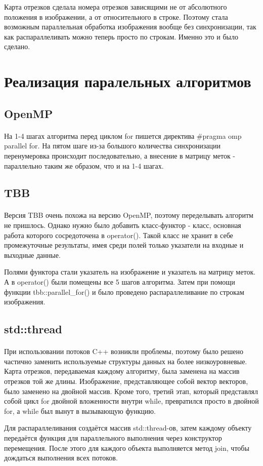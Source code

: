 \documentclass[14pt]{extarticle}
\begin{document}
\par Карта отрезков сделала номера отрезков зависящими не от абсолютного положения в изображении, а от относительного в строке. Поэтому стала возможным параллельная обработка изображения вообще без синхронизации, так как распараллеливать можно теперь просто по строкам. Именно это и было сделано.
\newpage
\section{Реализация паралельных алгоритмов}
\subsection{OpenMP}
\paragraph{} На 1-4 шагах алгоритма перед циклом for пишется директива \#pragma omp parallel for. На пятом шаге из-за большого количества синхронизации перенумеровка происходит последовательно, а внесение в матрицу меток - параллельно таким же образом, что и на 1-4 шагах.
\subsection{TBB}
\paragraph{} Версия TBB очень похожа на версию OpenMP, поэтому переделывать алгоритм не пришлось. Однако нужно было добавить класс-функтор - класс, основная работа которого сосредоточена в operator(). Такой класс не хранит в себе промежуточные результаты, имея среди полей только указатели на входные и выходные данные.
\par Полями функтора стали указатель на изображение и указатель на матрицу меток. А в operator() были помещены все 5 шагов алгоритма. Затем при помощи функции tbb::parallel\_for() и было проведено распараллеливание по строкам изображения.
\subsection{std::thread}
\paragraph{}  При использовании потоков C++ возникли проблемы, поэтому было решено частично заменить используемые структуры данных на более низкоуровневые. Карта отрезков, передаваемая каждому алгоритму, была заменена на массив отрезков той же длины. Изображение, представляющее собой вектор векторов, было заменено на двойной массив. Кроме того, третий этап, который представлял собой цикл for двойной вложенности внутри while, превратился просто в двойной for, а while был вынут в вызывающую функцию.
\par Для распараллеливания создаётся массив std::thread-ов, затем каждому объекту передаётся функция для параллельного выполнения через конструктор перемещения. После этого для каждого объекта выполняется метод join, чтобы дождаться выполнения всех потоков.
\newpage
\end{document}
